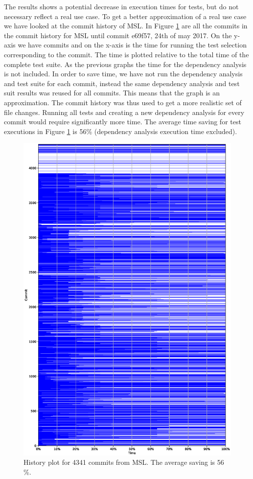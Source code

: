 \documentclass{cslthse-msc}
\begin{document}
The results shows a potential decrease in execution times for tests, but do not necessary reflect a real use case. To get a better approximation of a real use case we have looked at the commit history of MSL. In Figure \ref{fig:mslhistory} are all the commits in the commit history for MSL until commit e69f57, 24th of may 2017. On the y-axis we have commits and on the x-axis is the time for running the test selection corresponding to the commit. The time is plotted relative to the total time of the complete test suite. As the previous graphs the time for the dependency analysis is not included. In order to save time, we have not run the dependency analysis and test suite for each commit, instead the same dependency analysis and test suit results was reused for all commits. This means that the graph is an approximation. The commit history was thus used to get a more realistic set of file changes. Running all tests and creating a new dependency analysis for every commit would require significantly more time. The average time saving for test executions in Figure \ref{fig:mslhistory} is 56\% (dependency analysis execution time excluded).

\begin{figure}[!htbp]
    \centering
    \vspace{-0.5cm}
    \includegraphics[width=\textwidth]{Graphs/MSL_history_plot.eps}
    \caption{History plot for 4341 commits from MSL. The average saving is 56 \%.}
    \label{fig:mslhistory}
\end{figure}
\end{document}
